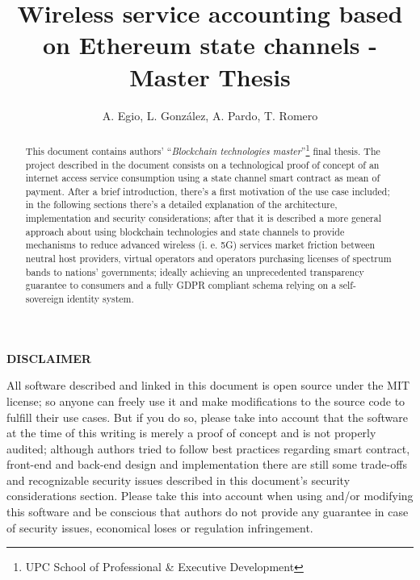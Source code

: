 \documentclass[12pt]{amsart}
\title{Wireless service accounting based on Ethereum state channels
- Master Thesis}
\author{
  A. Egio,
  L. González, A. Pardo, T. Romero
}
\begin{document}
\pagecolor{pagecolor}


\begin{abstract}
    This document contains authors' ``\textit{Blockchain
      technologies master}''\footnote{UPC School
      of Professional \& Executive Development}
    final thesis. The project described in the document
    consists on a technological proof
    of concept of an internet access service consumption
    using a state channel smart contract as
    mean of payment. After a brief
    introduction, there's a first motivation of
    the use case included;
    in the following sections
    there's a detailed explanation of
    the architecture, implementation and
    security considerations;
    after that it is described a more
    general approach about using blockchain technologies
    and state channels to provide
    mechanisms to reduce advanced wireless
    (i. e. 5G) services market friction between neutral host
    providers, virtual operators and operators
    purchasing licenses of spectrum bands to nations' governments;
    ideally achieving an unprecedented transparency guarantee to consumers and
    a fully GDPR compliant
    schema relying on a self-sovereign identity system.

\end{abstract}

\maketitle

\tableofcontents

\newpage

\vspace*{5cm}

\Huge{\textbf{DISCLAIMER}}
\vspace{1cm}


\Large
All software described and linked in this document is open source
under the MIT license; so anyone can freely use it and make
modifications to the source code to fulfill their use
cases. But if you do so, please take into account that the software
at the time of this writing is merely
a proof of concept and is not properly audited; although
authors tried to follow best practices regarding smart contract,
front-end and back-end design and implementation there are still
some trade-offs and recognizable security issues
described in this document's
security considerations section. Please take this into account
when using and/or modifying this software and be conscious
that authors do not provide any guarantee in case of
security issues, economical loses or regulation infringement.
\end{document}
